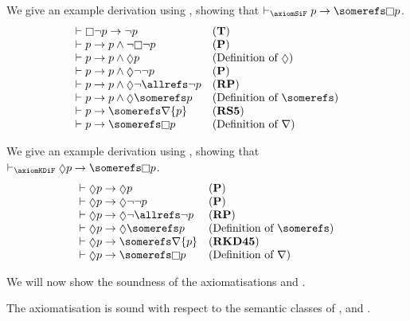 \begin{example}
We give an example derivation using \axiomSiF{}, showing that
$\proves_{\axiomSiF} p \implies \somerefs \knows p$.
$$
\begin{array}{ll}
\proves \knows \neg p \implies \neg p & \text{({\bf T})}\\
\proves p \implies p \land \neg \knows \neg p & \text{({\bf P})}\\
\proves p \implies p \land \suspects p & \text{(Definition of $\suspects$)}\\
\proves p \implies p \land \suspects \neg \neg p & \text{({\bf P})}\\
\proves p \implies p \land \suspects \neg \allrefs \neg p & \text{({\bf RP})}\\
\proves p \implies p \land \suspects \somerefs p & \text{(Definition of $\somerefs$)}\\
\proves p \implies \somerefs \covers \{ p \} & \text{({\bf RS5})}\\
\proves p \implies \somerefs \knows p & \text{(Definition of $\covers$)}
\end{array}
$$
\end{example}

\begin{example}
We give an example derivation using \axiomKDiF{}, showing that
$\proves_{\axiomKDiF} \suspects p \implies \somerefs \knows p$.
$$
\begin{array}{ll}
\proves \suspects p \implies \suspects p & \text{({\bf P})}\\
\proves \suspects p \implies \suspects \neg \neg p & \text{({\bf P})}\\
\proves \suspects p \implies \suspects \neg \allrefs \neg p & \text{({\bf RP})}\\
\proves \suspects p \implies \suspects \somerefs p & \text{(Definition of $\somerefs$)}\\
\proves \suspects p \implies \somerefs \covers \{ p \} & \text{({\bf RKD45})}\\
\proves \suspects p \implies \somerefs \knows p & \text{(Definition of $\covers$)}
\end{array}
$$
\end{example}

We will now show the soundness of the axiomatisations \axiomSiF{} and
\axiomKDiF{}.

\pagebreak

\begin{lemma}
The axiomatisation \axiomFi{} is sound with respect to the semantic classes of
\classKi{}, \classSi{} and \classKDi{}.
\end{lemma}

